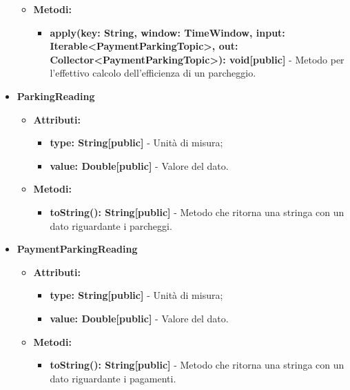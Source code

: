 \documentclass[8pt]{article}
\begin{document}
\begin{itemize}
\begin{itemize}
    \end{itemize}
    \begin{itemize}
        \item \textbf{Metodi:}
        \begin{itemize}
            \item \textbf{apply(key: String, window: TimeWindow, input: Iterable<PaymentParkingTopic>, out: Collector<PaymentParkingTopic>): void[public]} - Metodo per l'effettivo calcolo dell'efficienza di un parcheggio.
        \end{itemize}
    \end{itemize}
    \item \textbf{ParkingReading}
    \begin{itemize}
        \item \textbf{Attributi:}
        \begin{itemize}
            \item \textbf{type: String[public]} - Unità di misura;
            \item \textbf{value: Double[public]} - Valore del dato.
        \end{itemize}
    \end{itemize}
    \begin{itemize}
        \item \textbf{Metodi:}
        \begin{itemize}
            \item \textbf{toString(): String[public]} - Metodo che ritorna una stringa con un dato riguardante i parcheggi.
        \end{itemize}
    \end{itemize}
    \item \textbf{PaymentParkingReading}
    \begin{itemize}
        \item \textbf{Attributi:}
        \begin{itemize}
            \item \textbf{type: String[public]} - Unità di misura;
            \item \textbf{value: Double[public]} - Valore del dato.
        \end{itemize}
    \end{itemize}
    \begin{itemize}
        \item \textbf{Metodi:}
        \begin{itemize}
            \item \textbf{toString(): String[public]} - Metodo che ritorna una stringa con un dato riguardante i pagamenti.

\end{itemize}
\end{itemize}
\end{itemize}
\end{document}
